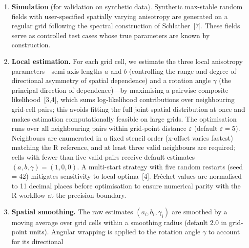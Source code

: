 \documentclass[preprint,12pt,a4paper]{elsarticle}
\newcommand{\rev}[1]{{#1}}
\newcommand{\revr}[1]{{\color{RevisionRed}#1}}
\begin{document}
\begin{enumerate}
\begin{enumerate}
{    GEV at each cell is then used to apply the probability integral
    transform: each annual maximum is mapped through its own GEV
    cumulative distribution function, producing a value on the
    unit Fr\'{e}chet scale (the common marginal form required by
    max-stable models, as described in Section~\ref{sec:motivation}).
    \revr{This puts all cells on an equal footing before spatial
    dependence is estimated: what remains captures where extremes
    co-occur, not how large they are at any individual site.}
    Values are clipped to $[0.05,\, n_{\text{years}}^{2}]$ to
    suppress numerical artefacts at the tails.}
  \end{enumerate}
\item \textbf{Simulation} (for validation on synthetic data).
  Synthetic max-stable random fields with
  user-specified spatially varying anisotropy are generated on a
  regular grid following the spectral construction of
  Schlather~[7]. These fields serve as controlled test cases whose
  true parameters are known by construction.
\item \textbf{Local estimation.}
  For each grid cell, we estimate the three local anisotropy
  parameters---semi-axis lengths $a$ and $b$ (controlling the range
  and degree of directional asymmetry of spatial dependence) and a
  rotation angle $\gamma$ (the principal direction of dependence)---by
  maximising a pairwise composite likelihood~[3,4]\revr{, which sums
  log-likelihood contributions over neighbouring grid-cell pairs;
  this avoids fitting the full joint spatial distribution at once and
  makes estimation computationally feasible on large grids.} The
  optimisation runs over all neighbouring pairs within grid-point
  distance $\varepsilon$ (default $\varepsilon=5$).
  \rev{Neighbours are enumerated in a fixed stencil order
  (x-offset varies fastest) matching the R reference, and at least
  three valid neighbours are required; cells with fewer than five
  valid pairs receive default estimates $(a,b,\gamma) = (1,0,0)$.
  A multi-start strategy with five random restarts (seed = 42)
  mitigates sensitivity to local optima~[4]. Fr\'{e}chet values
  are normalised to 11 decimal places before optimisation to
  ensure numerical parity with the R workflow at the precision
  boundary.}
\item \textbf{\rev{Spatial smoothing.}}
  \rev{The raw estimates $(a_i, b_i, \gamma_i)$ are smoothed by a
  moving average over grid cells within a smoothing radius (default
  2.0 in grid-point units).  Angular wrapping is applied to the
  rotation angle $\gamma$ to account for its directional
}
\end{enumerate}
\end{document}
